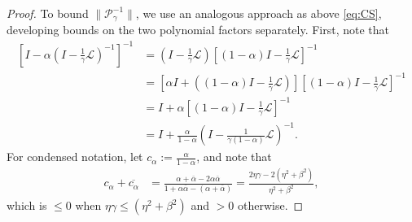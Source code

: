 \documentclass[review]{siamart}
\begin{document}
\begin{proof}
To bound $\|\mathcal{P}_\gamma^{-1}\|$, we use an analogous approach as above
\eqref{eq:CS}, developing bounds on the two polynomial factors separately.
First, note that
%
\begin{align}\nonumber
\left[I - \alpha\left(I - \tfrac{1}{\gamma}\mathcal{L}\right)^{-1}\right]^{-1}
	& = \left(I - \tfrac{1}{\gamma}\mathcal{L}\right)
		\left[(1-\alpha)I - \tfrac{1}{\gamma}\mathcal{L}\right]^{-1} \nonumber\\
& = \left[\alpha I + ((1-\alpha)I - \tfrac{1}{\gamma}\mathcal{L})\right]
		\left[(1-\alpha)I - \tfrac{1}{\gamma}\mathcal{L}\right]^{-1} \nonumber\\
& = I + \alpha \left[(1-\alpha)I - \tfrac{1}{\gamma}\mathcal{L}\right]^{-1} \nonumber\\
& = I + \frac{\alpha}{1-\alpha} \left(I - \tfrac{1}{\gamma(1-\alpha)}\mathcal{L}\right)^{-1}.
	\label{eq:inv_factor}
\end{align}
%
For condensed notation, let $c_\alpha := \tfrac{\alpha}{1-\alpha}$, and note that
%
\begin{align*}
c_\alpha+\overline{c_\alpha} & = \frac{\alpha + \overline{\alpha} - 2\alpha\overline{\alpha}}
	{1 + \alpha\overline{\alpha} - (\alpha + \overline{\alpha})}
= \frac{2\eta\gamma - 2(\eta^2+\beta^2)}{\eta^2+\beta^2},
\end{align*}
%
which is $\leq 0$ when $\eta\gamma \leq (\eta^2+\beta^2)$ and $>0$ otherwise.


\end{proof}
\end{document}
